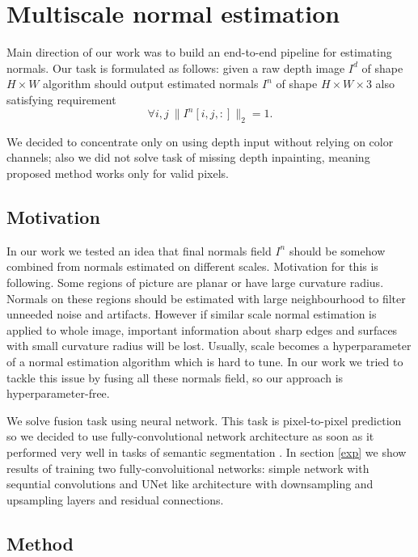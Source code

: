 \chapter{Multiscale normal estimation} \label{multiscale-normal-estimation}

Main direction of our work was to build an end-to-end pipeline for estimating normals. Our task is formulated as follows: given a raw depth image $I^d$ of shape $H \times W$ algorithm should output estimated normals $I^n$ of shape $H \times W \times 3$ also satisfying requirement 
\begin{equation}
\forall i,j\ \|I^n\left[i, j, :\right]\|_2 = 1. \label{eq:1}
\end{equation}

We decided to concentrate only on using depth input without relying on color channels; also we did not solve task of missing depth inpainting, meaning proposed method works only for valid pixels.

\section{Motivation}

In our work we tested an idea that final normals field $I^n$ should be somehow combined from normals estimated on different scales. Motivation for this is following. Some regions of picture are planar or have large curvature radius. Normals on these regions should be estimated with large neighbourhood to filter unneeded noise and artifacts. However if similar scale normal estimation is applied to whole image, important information about sharp edges and surfaces with small curvature radius will be lost. Usually, scale becomes a hyperparameter of a normal estimation algorithm which is hard to tune. In our work we tried to tackle this issue by fusing all these normals field, so our approach is hyperparameter-free.

We solve fusion task using neural network. This task is pixel-to-pixel prediction so we decided to use fully-convolutional network architecture as soon as it performed very well in tasks of semantic segmentation \cite{fcn}. In section \ref{exp} we show results of training two fully-convoluitional networks: simple network with sequntial convolutions and UNet \cite{unet} like architecture with downsampling and upsampling layers and residual connections.

\section{Method} \label{method}

